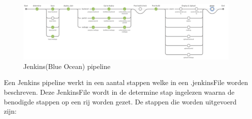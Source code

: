 \begin{figure}[H]
    \myfloatalign
    \includegraphics[width=15cm]{gfx/Screenshot 2021-08-18 Jenkins PipeLine}
    \caption{Jenkins(Blue Ocean) pipeline}
    \label{fig:JenkinsPipeLine}
\end{figure}
Een Jenkins pipeline werkt in een aantal stappen welke in een .jenkinsFile worden beschreven.
Deze JenkinsFile wordt in de determine stap ingelezen waarna de benodigde stappen op een rij worden gezet.
De stappen die worden uitgevoerd zijn:
